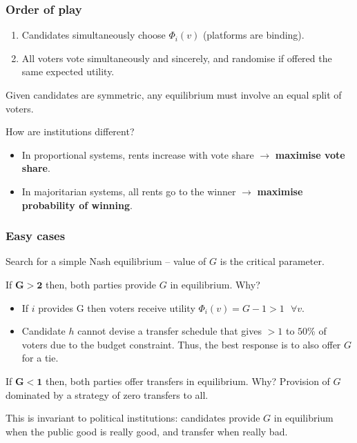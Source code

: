 \documentclass[11pt,aspectratio=169]{beamer}
\begin{document}
\begin{frame}
\frametitle{Order of play}
\begin{enumerate}
\item Candidates simultaneously choose $\Phi_i(v)$ (platforms are binding). 

\item All voters vote simultaneously and sincerely, and randomise if offered the same expected utility.
\end{enumerate}

\noindent Given candidates are symmetric, any equilibrium must involve an equal split of voters. 

\bigskip

\pause 

How are institutions different?
\pause 
\begin{itemize}
\item In \alert{proportional systems}, rents increase with vote share $\rightarrow$ \textbf{maximise vote share}.
\pause 
\item In \alert{majoritarian systems}, all rents go to the winner $\rightarrow$ \textbf{maximise probability of winning}.
\end{itemize}

\end{frame}


\begin{frame}
\frametitle{Easy cases}

\noindent Search for a simple Nash equilibrium -- value of $G$ is the critical parameter.

\bigskip

\noindent If $\mathbf{G>2}$ then, both parties provide $G$ in equilibrium. \alert{Why?}

\begin{itemize}
\item If $i$ provides G then voters receive utility $\Phi_i(v) = G − 1 > 1 \, \, \, \, \forall v$. 
\item Candidate $h$ cannot devise a transfer schedule that gives $>1$ to $50$\% of voters due to the budget constraint. Thus, the best response is to also offer $G$ for a tie.
\end{itemize}


\bigskip

\pause 

\noindent If $\mathbf{G<1}$ then, both parties offer transfers in equilibrium. \alert{Why?} \pause Provision of $G$ dominated by a strategy of zero transfers to all.

\bigskip
\pause 
This is invariant to political institutions: candidates provide $G$ in equilibrium when the public good is really good, and transfer when really bad.

\end{frame}
\end{document}
